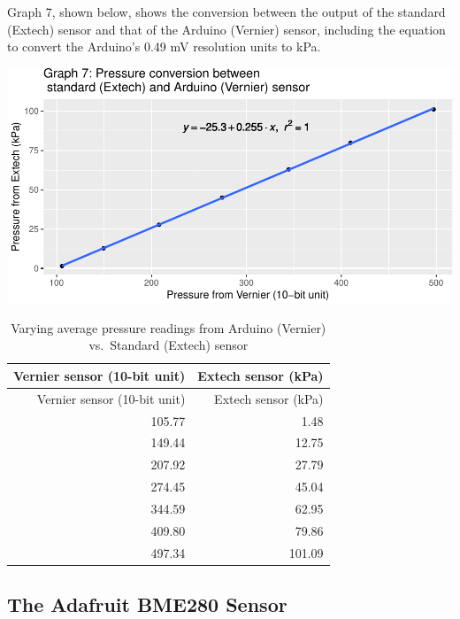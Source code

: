 \documentclass[12pt,]{article}
\begin{document}
Graph 7, shown below, shows the conversion between the output of the
standard (Extech) sensor and that of the Arduino (Vernier) sensor,
including the equation to convert the Arduino's 0.49 mV resolution units
to kPa.

\includegraphics{paper_files/figure-latex/vernier_cal2-1.pdf}

\begin{longtable}[]{@{}rr@{}}
\caption{Varying average pressure readings from Arduino (Vernier)
vs.~Standard (Extech) sensor}\tabularnewline
\toprule
Vernier sensor (10-bit unit) & Extech sensor (kPa)\tabularnewline
\midrule
\endfirsthead
\toprule
Vernier sensor (10-bit unit) & Extech sensor (kPa)\tabularnewline
\midrule
\endhead
105.77 & 1.48\tabularnewline
149.44 & 12.75\tabularnewline
207.92 & 27.79\tabularnewline
274.45 & 45.04\tabularnewline
344.59 & 62.95\tabularnewline
409.80 & 79.86\tabularnewline
497.34 & 101.09\tabularnewline
\bottomrule
\end{longtable}

\subsection{The Adafruit BME280
Sensor}\label{the-adafruit-bme280-sensor}
\end{document}
